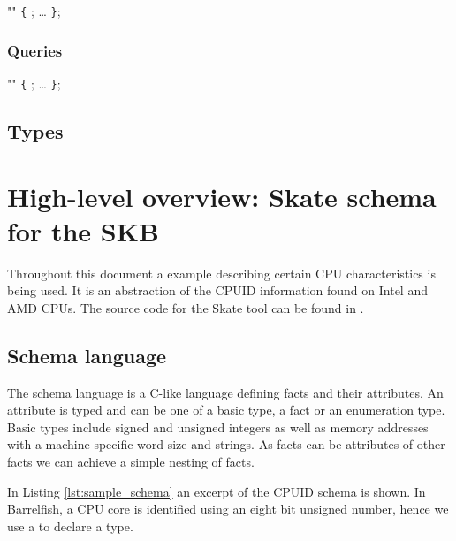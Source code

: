 \documentclass[a4paper,11pt,twoside]{report}
\begin{document}
{{\begin{syntax}
   "" \verb+{+
    ;
    \ldots
\verb+}+;
\end{syntax}





\subsection{Queries}

\begin{syntax}
  "" \verb+{+
    ;
    \ldots
\verb+}+;
\end{syntax}

\section{Types}\label{sec:decl:types}


\chapter{High-level overview: Skate schema for the SKB}
\label{chap:overview}




Throughout this document a example describing certain CPU characteristics is
being used. It is an abstraction of the CPUID information found on Intel and AMD
CPUs. The source code for the Skate tool can be found in
.

\section{Schema language}

The schema language is a C-like language defining facts and their attributes. An
attribute is typed and can be one of a basic type, a fact or an enumeration
type. Basic types include signed and unsigned integers as well as memory
addresses with a machine-specific word size and strings. As facts can be
attributes of other facts we can achieve a simple nesting of facts.

In Listing \ref{lst:sample_schema} an excerpt of the CPUID schema is shown. In
Barrelfish, a CPU core is identified using an eight bit unsigned number, hence
we use a  to declare a  type.

\begin{lstlisting}[caption={Sample Skate schema definition},
label={lst:sample_schema},language=Skate]


\end{lstlisting}}}
\end{document}
